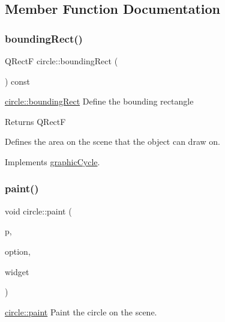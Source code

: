 \subsection{Member Function Documentation}
\mbox{\label{classcircle_ab9d2059829ac8f0420c7e711caeb61c7}} 
\subsubsection{\texorpdfstring{bounding\+Rect()}{boundingRect()}}
{\footnotesize\ttfamily Q\+RectF circle\+::bounding\+Rect (\begin{DoxyParamCaption}{ }\end{DoxyParamCaption}) const\hspace{0.3cm}{\ttfamily [virtual]}}



\mbox{\hyperlink{classcircle_ab9d2059829ac8f0420c7e711caeb61c7}{circle\+::bounding\+Rect}} Define the bounding rectangle 

\begin{DoxyReturn}{Returns}
Q\+RectF
\end{DoxyReturn}
Defines the area on the scene that the object can draw on. 

Implements \mbox{\hyperlink{classgraphic_cycle}{graphic\+Cycle}}.

\mbox{\label{classcircle_af1bdbb1e1ef3f18c1eeda5a24ea13ead}} 
\subsubsection{\texorpdfstring{paint()}{paint()}}
{\footnotesize\ttfamily void circle\+::paint (\begin{DoxyParamCaption}\item[{Q\+Painter $\ast$}]{p,  }\item[{const Q\+Style\+Option\+Graphics\+Item $\ast$}]{option,  }\item[{Q\+Widget $\ast$}]{widget }\end{DoxyParamCaption})\hspace{0.3cm}{\ttfamily [virtual]}}



\mbox{\hyperlink{classcircle_af1bdbb1e1ef3f18c1eeda5a24ea13ead}{circle\+::paint}} Paint the circle on the scene. 


